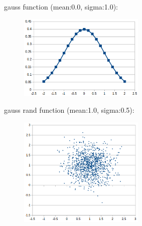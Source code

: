 gauss function (mean:0.0, sigma:1.0):\\
\begin{center}
\begin{figure}[H]
\centering\includegraphics[width=6cm]{./gauss.png}\\
\end{figure}
\end{center}

gauss rand function (mean:1.0, sigma:0.5):\\
\begin{center}
\begin{figure}[H]
\centering\includegraphics[width=6cm]{./gaussrnd.png}\\
\end{figure}
\end{center}

